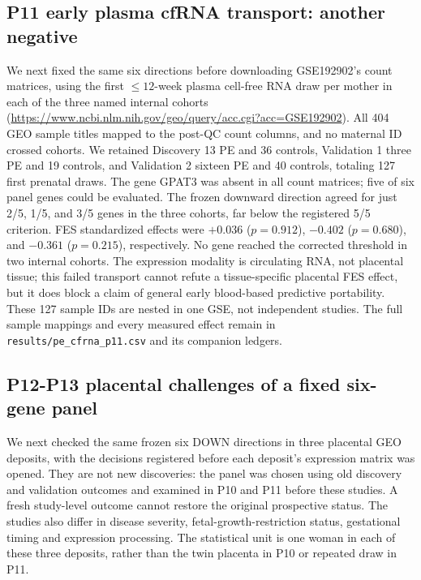 \documentclass[11pt,a4paper]{article}
\begin{document}
\subsection{P11 early plasma cfRNA transport: another negative}
We next fixed the same six directions before downloading GSE192902's count matrices, using the first $\leq12$-week plasma cell-free RNA draw per mother in each of the three named internal cohorts (\url{https://www.ncbi.nlm.nih.gov/geo/query/acc.cgi?acc=GSE192902}). All 404 GEO sample titles mapped to the post-QC count columns, and no maternal ID crossed cohorts. We retained Discovery 13 PE and 36 controls, Validation 1 three PE and 19 controls, and Validation 2 sixteen PE and 40 controls, totaling 127 first prenatal draws. The gene GPAT3 was absent in all count matrices; five of six panel genes could be evaluated. The frozen downward direction agreed for just 2/5, 1/5, and 3/5 genes in the three cohorts, far below the registered 5/5 criterion. FES standardized effects were $+0.036$ ($p=0.912$), $-0.402$ ($p=0.680$), and $-0.361$ ($p=0.215$), respectively. No gene reached the corrected threshold in two internal cohorts. 
The expression modality is circulating RNA, not placental tissue; this failed transport cannot refute a tissue-specific placental FES effect, but it does block a claim of general early blood-based predictive portability. These 127 sample IDs are nested in one GSE, not independent studies. The full sample mappings and every measured effect remain in \texttt{results/pe\_cfrna\_p11.csv} and its companion ledgers.


\subsection{P12-P13 placental challenges of a fixed six-gene panel}
We next checked the same frozen six DOWN directions in three placental GEO deposits, with the decisions registered before each deposit's expression matrix was opened. They are not new discoveries: the panel was chosen using old discovery and validation outcomes and examined in P10 and P11 before these studies. A fresh study-level outcome cannot restore the original prospective status. The studies also differ in disease severity, fetal-growth-restriction status, gestational timing and expression processing. The statistical unit is one woman in each of these three deposits, rather than the twin placenta in P10 or repeated draw in P11.
\end{document}

